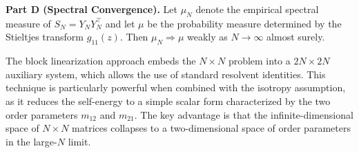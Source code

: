 \begin{theorem}
\medskip
\noindent\textbf{Part D (Spectral Convergence).} Let $\mu_N$ denote the empirical spectral measure of $S_N = Y_N Y_N^\top$ and let $\mu$ be the probability measure determined by the Stieltjes transform $g_{11}(z)$. Then $\mu_N \Rightarrow \mu$ weakly as $N \to \infty$ almost surely.
\end{theorem}

\begin{remark}
The block linearization approach embeds the $N \times N$ problem into a $2N \times 2N$ auxiliary system, which allows the use of standard resolvent identities. This technique is particularly powerful when combined with the isotropy assumption, as it reduces the self-energy to a simple scalar form characterized by the two order parameters $m_{12}$ and $m_{21}$. The key advantage is that the infinite-dimensional space of $N \times N$ matrices collapses to a two-dimensional space of order parameters in the large-$N$ limit.
\end{remark}
